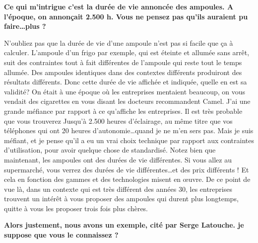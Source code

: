 \begin{small}


\textbf{Ce qui m'intrigue c'est la  durée de vie annoncée des ampoules. A l'époque, on annonçait 2.500 h. Vous ne pensez pas qu'ils auraient pu faire\dots plus ?
}\smallbreak

N'oubliez pas que la durée de vie d'une ampoule n'est pas si facile que ça à calculer. L'ampoule d'un frigo par exemple, qui est éteinte et allumée sans arrêt, suit des contraintes tout à fait différentes de l'ampoule qui reste tout le temps allumée.
Des ampoules identiques dans des contextes différents produiront des résultats différents. Donc cette durée de vie affichée et indiquée, quelle en est sa validité? On était à une époque où les entreprises mentaient beaucoup, on vous vendait des cigarettes en vous disant \og les docteurs recommandent Camel\fg{}. J'ai une grande méfiance par rapport à ce qu'affiche les entreprises. Il est très probable que vous trouverez \og Jusqu'à 2.500 heures d'éclairage\fg{}, au même titre que vos téléphones qui ont 20 heures d'autonomie\dots quand je ne m'en sers pas.
Mais je suis méfiant, et je pense qu'il a eu un vrai choix technique par rapport aux contraintes d'utilisation, pour avoir quelque chose de standardisé.
Notez bien que maintenant, les ampoules ont des durées de vie différentes. Si vous allez au supermarché, vous verrez des durées de vie différentes\dots et des prix différents ! Et cela en fonction des gammes et des technologies misent en œuvre.
De ce point de vue là, dans un contexte qui est très différent des années 30, les entreprises trouvent un intérêt à vous proposer des ampoules qui durent plus longtemps, quitte à vous les proposer trois fois plus chères.

\textbf{Alors justement, nous avons un exemple, cité par Serge Latouche. je suppose que vous le connaissez ?}
\smallbreak



\end{small}

